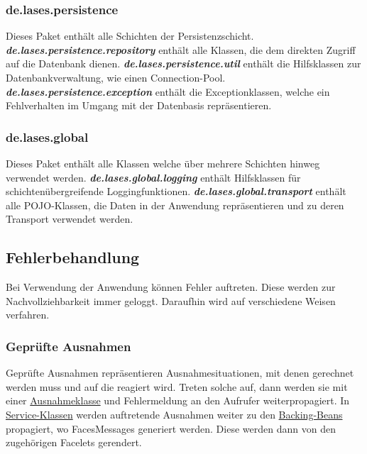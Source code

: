 \subsubsection{de.lases.persistence}\label{arch:persistence}
Dieses Paket enthält alle Schichten der Persistenzschicht.
\newline\newline
\textbf{\emph{de.lases.persistence.repository}}\label{arch:repository}
enthält alle Klassen, die dem direkten Zugriff auf die Datenbank dienen.
\newline\newline
\textbf{\emph{de.lases.persistence.util}}
enthält die Hilfsklassen zur Datenbankverwaltung, wie einen
Connection-Pool.
\newline\newline
\textbf{\emph{de.lases.persistence.exception}}
enthält die Exceptionklassen, welche ein Fehlverhalten im Umgang mit der
Datenbasis repräsentieren.

\subsubsection{de.lases.global}
Dieses Paket enthält alle Klassen welche über mehrere Schichten hinweg
verwendet werden.
\newline\newline
\textbf{\emph{de.lases.global.logging}}
enthält Hilfsklassen für schichtenübergreifende Loggingfunktionen.
\newline\newline
\textbf{\emph{de.lases.global.transport}}\label{arch:transport}
enthält alle POJO-Klassen, die Daten in der Anwendung repräsentieren und zu deren
Transport verwendet werden.


\subsection{Fehlerbehandlung}
Bei Verwendung der Anwendung können Fehler auftreten. Diese werden zur Nachvollziehbarkeit
immer geloggt. Daraufhin wird auf verschiedene Weisen verfahren.

\subsubsection{Geprüfte Ausnahmen}
Geprüfte Ausnahmen repräsentieren Ausnahmesituationen, mit
denen gerechnet werden muss und auf die reagiert wird.
Treten solche auf, dann werden sie mit einer
\hyperref[arch:busex]{Ausnahmeklasse} und Fehlermeldung
an den Aufrufer weiterpropagiert.
In \hyperref[arch:service]{Service-Klassen} werden auftretende Ausnahmen weiter zu den
\hyperref[arch:backing]{Backing-Beans} propagiert, wo FacesMessages %
generiert werden.
Diese werden dann von den zugehörigen Facelets %
gerendert.

